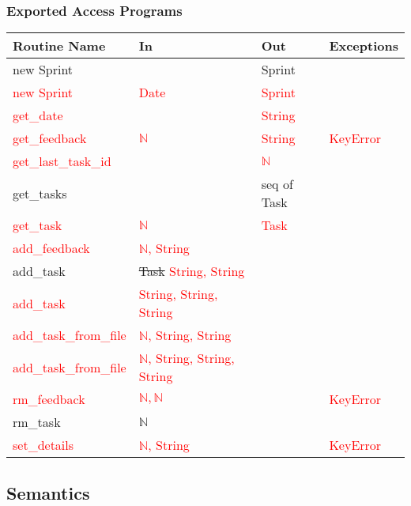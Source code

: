 \documentclass[12pt, titlepage]{article}
\begin{document}
\subsubsection* {Exported Access Programs}
\begin{tabular}{|l|l|l|l|}
    \hline
    \textbf{Routine Name} & \textbf{In} & \textbf{Out} & \textbf{Exceptions} \\
    \hline
    new Sprint & & Sprint & \\
    \hline
    \textcolor{red}{new Sprint} & \textcolor{red}{Date} & \textcolor{red}{Sprint} & \\
    \hline
    \textcolor{red}{get\_date} &  & \textcolor{red}{String} & \\
    \hline
    \textcolor{red}{get\_feedback} & \textcolor{red}{$\mathbb{N}$}& \textcolor{red}{String} & \textcolor{red}{KeyError}\\
    \hline
    \textcolor{red}{get\_last\_task\_id} & & \textcolor{red}{$\mathbb{N}$}& \\
    \hline
    get\_tasks & & seq of Task &\\
    \hline
    \textcolor{red}{get\_task} & \textcolor{red}{$\mathbb{N}$}& \textcolor{red}{Task} &\\
    \hline
    \textcolor{red}{add\_feedback} & \textcolor{red}{$\mathbb{N}$, String} & &\\
    \hline
    add\_task & \sout{Task} \textcolor{red}{String, String} & & \\
    \hline
    \textcolor{red}{add\_task} & \textcolor{red}{String, String, String} & & \\
    \hline
    \textcolor{red}{add\_task\_from\_file} & \textcolor{red}{$\mathbb{N}$, String, String} & & \\
    \hline
    \textcolor{red}{add\_task\_from\_file} & \textcolor{red}{$\mathbb{N}$, String, String, String} & &\\
    \hline
    \textcolor{red}{rm\_feedback} & \textcolor{red}{$\mathbb{N,N}$}& & \textcolor{red}{KeyError}\\
    \hline
    rm\_task & $\mathbb{N}$ & &\\
    \hline
    \textcolor{red}{set\_details} & \textcolor{red}{$\mathbb{N}$, String} & & \textcolor{red}{KeyError}\\
    \hline
\end{tabular}

\subsection*{Semantics}
\end{document}
